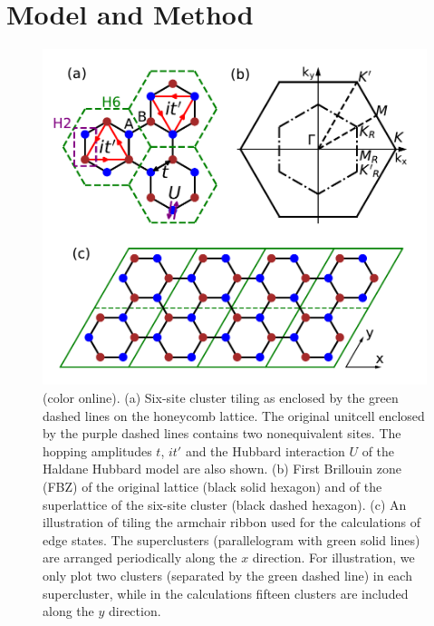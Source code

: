 \documentclass[12pt]{iopart}
\begin{document}
\section{Model and Method}\label{MM}

\begin{figure}
\centering
\includegraphics[scale=1.0]{lattice}
\caption{(color online). (a) Six-site cluster tiling as enclosed by the green dashed lines on the honeycomb lattice. The original unitcell enclosed by the purple dashed lines contains two nonequivalent sites. The hopping amplitudes $t$, $it'$ and the Hubbard interaction $U$ of the Haldane Hubbard model are also shown. (b) First Brillouin zone (FBZ) of the original lattice (black solid hexagon) and of the superlattice of the six-site cluster (black dashed hexagon). (c) An illustration of tiling the armchair ribbon used for the calculations of edge states. The superclusters (parallelogram with green solid lines) are arranged periodically along the $x$ direction. For illustration, we only plot two clusters (separated by the green dashed line) in each supercluster, while in the calculations fifteen clusters are included along the $y$ direction.}\label{lattice}
\end{figure}
\end{document}

